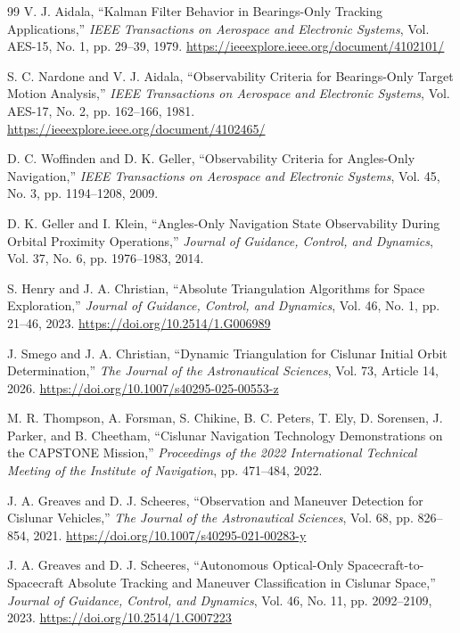 \documentclass[10pt,twocolumn]{article}
\begin{document}
\begin{thebibliography}{99}
V. J. Aidala, ``Kalman Filter Behavior in Bearings-Only Tracking Applications,'' \textit{IEEE Transactions on Aerospace and Electronic Systems}, Vol. AES-15, No. 1, pp. 29--39, 1979. \url{https://ieeexplore.ieee.org/document/4102101/}

S. C. Nardone and V. J. Aidala, ``Observability Criteria for Bearings-Only Target Motion Analysis,'' \textit{IEEE Transactions on Aerospace and Electronic Systems}, Vol. AES-17, No. 2, pp. 162--166, 1981. \url{https://ieeexplore.ieee.org/document/4102465/}

D. C. Woffinden and D. K. Geller, ``Observability Criteria for Angles-Only Navigation,'' \textit{IEEE Transactions on Aerospace and Electronic Systems}, Vol. 45, No. 3, pp. 1194--1208, 2009.

D. K. Geller and I. Klein, ``Angles-Only Navigation State Observability During Orbital Proximity Operations,'' \textit{Journal of Guidance, Control, and Dynamics}, Vol. 37, No. 6, pp. 1976--1983, 2014.

S. Henry and J. A. Christian, ``Absolute Triangulation Algorithms for Space Exploration,'' \textit{Journal of Guidance, Control, and Dynamics}, Vol. 46, No. 1, pp. 21--46, 2023. \url{https://doi.org/10.2514/1.G006989}

J. Smego and J. A. Christian, ``Dynamic Triangulation for Cislunar Initial Orbit Determination,'' \textit{The Journal of the Astronautical Sciences}, Vol. 73, Article 14, 2026. \url{https://doi.org/10.1007/s40295-025-00553-z}

M. R. Thompson, A. Forsman, S. Chikine, B. C. Peters, T. Ely, D. Sorensen, J. Parker, and B. Cheetham, ``Cislunar Navigation Technology Demonstrations on the CAPSTONE Mission,'' \textit{Proceedings of the 2022 International Technical Meeting of the Institute of Navigation}, pp. 471--484, 2022.

J. A. Greaves and D. J. Scheeres, ``Observation and Maneuver Detection for Cislunar Vehicles,'' \textit{The Journal of the Astronautical Sciences}, Vol. 68, pp. 826--854, 2021. \url{https://doi.org/10.1007/s40295-021-00283-y}

J. A. Greaves and D. J. Scheeres, ``Autonomous Optical-Only Spacecraft-to-Spacecraft Absolute Tracking and Maneuver Classification in Cislunar Space,'' \textit{Journal of Guidance, Control, and Dynamics}, Vol. 46, No. 11, pp. 2092--2109, 2023. \url{https://doi.org/10.2514/1.G007223}


\end{thebibliography}
\end{document}
